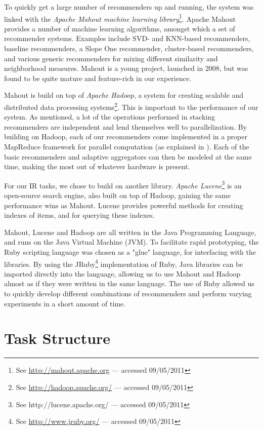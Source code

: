 To quickly get a large number of recommenders up and running,
the system was linked with the \emph{Apache Mahout machine learning library}\footnote{
See \url{http://mahout.apache.org} --- accessed 09/05/2011}. 
Apache Mahout provides a number of machine learning
algorithms, amongst which a set of recommender systems.
Examples include SVD- and KNN-based recommenders,
baseline recommenders, a Slope One recommender,
cluster-based recommenders,
and various generic recommenders for mixing different 
similarity and neighborhood measures.
Mahout is a young project, launched in 2008, 
but was found to be quite mature and feature-rich
in our experience.

Mahout is build on top of \emph{Apache Hadoop},
a system for creating scalable and distributed data processing systems\footnote{
See \url{http://hadoop.apache.org/} --- accessed 09/05/2011}.
This is important to the performance of our system.
As mentioned, a lot of the operations performed in stacking recommenders
are independent and lend themselves well to parallelization.
By building on Hadoop, each of our recommenders come implemented in a 
proper MapReduce framework for parallel computation (as explained in \citet[p75]{Manning2008}).
Each of the basic recommenders and adaptive aggregators can then be modeled at the same time,
making the most out of whatever hardware is present.

For our IR tasks, we chose to build on another library.
\emph{Apache Lucene}\footnote{
See http://lucene.apache.org/ --- accessed 09/05/2011} is an open-source search engine, also built on top of Hadoop,
gaining the same performance wins as Mahout.
Lucene provides powerful methods for creating indexes of items, and for querying these indexes.

Mahout, Lucene and Hadoop are all written in the Java Programming Language,
and runs on the Java Virtual Machine (JVM).
To facilitate rapid prototyping, the Ruby scripting language was chosen as a "glue" language,
for interfacing with the libraries. 
By using the JRuby\footnote{
See \url{http://www.jruby.org/} --- accessed 09/05/2011} 
implementation of Ruby, Java libraries can be imported directly
into the language, allowing us to use Mahout and Hadoop almost as if they were written in the same language.
The use of Ruby allowed us to quickly develop different combinations of recommenders and
perform varying experiments in a short amount of time.

\section{Task Structure}

